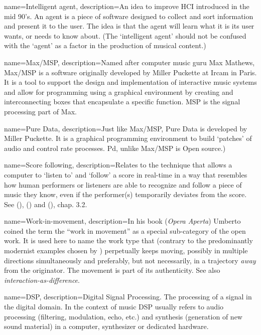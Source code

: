 {name={Intelligent agent},
  description={An idea to improve HCI introduced in the mid 90's. An agent is a piece of software designed to collect and sort information and present it to the user. The idea is that the agent will learn what it is its user wants, or needs to know about. (The `intelligent agent' should not be confused with the `agent' as a factor in the production of musical content.)}}

{name={Max/MSP},
  description={Named after computer music guru Max Mathews, Max/MSP is a software originally developed by Miller Puckette at Ircam in Paris. It is a tool to support the design and implementation of interactive music systems and allow for programming using a graphical environment by creating and interconnecting boxes that encapsulate a specific function. MSP is the signal processing part of Max.}}

{name={Pure Data},
  description={Just like Max/MSP, Pure Data is developed by Miller Puckette. It is a graphical programming environment to build `patches' of audio and control rate processes. Pd, unlike Max/MSP is Open source.)}}

{name={Score following},
  description={Relates to the technique that allows a computer to `listen to' and `follow' a score in real-time in a way that resembles how human performers or listeners are able to recognize and follow a piece of music they know, even if the performer(s) temporarily deviates from the score. See \citeauthor{dannenberg89} (\citeyear{dannenberg89}), \citeauthor{dannenberg06} (\citeyear{dannenberg06}) and \citeauthor{rowe} (\citeyear{rowe}), chap. 3.2.}}

{name={Work-in-movement},
  description={In his book  (\emph{Opera Aperta}) Umberto \citeauthor{eco68} coined the term the ``work in movement'' as a special sub-category of the open work. It is used here to name the work type that (contrary to the predominantly modernist examples chosen by \citeauthor{eco68}) perpetually keeps moving, possibly in multiple directions simultaneously and preferably, but not necessarily, in a trajectory \emph{away} from the originator. The movement is part of its authenticity. See also \emph{interaction-as-difference}.}}

{name={DSP},
  description={Digital Signal Processing. The processing of a signal in the digital domain. In the context of music DSP usually refers to audio processing (filtering, modulation, echo, etc.) and synthesis (generation of new sound material) in a computer, synthesizer or dedicated hardware.}}

